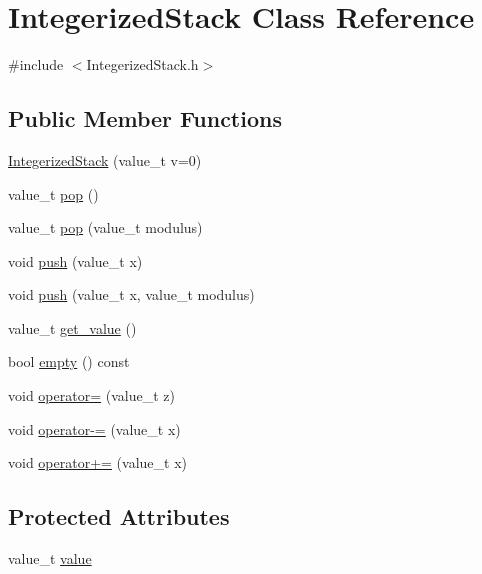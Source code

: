 \hypertarget{class_integerized_stack}{}\section{Integerized\+Stack Class Reference}
\label{class_integerized_stack}


{\ttfamily \#include $<$Integerized\+Stack.\+h$>$}

\subsection*{Public Member Functions}
\begin{DoxyCompactItemize}
\item 
\hyperlink{class_integerized_stack_a46b24ace7ea983bfabaa437932111440}{Integerized\+Stack} (value\+\_\+t v=0)
\item 
value\+\_\+t \hyperlink{class_integerized_stack_a5edd593c74341341cc6f8e41e0f14bdf}{pop} ()
\item 
value\+\_\+t \hyperlink{class_integerized_stack_a713da8c8102cb5a53ec3ad87fada36f5}{pop} (value\+\_\+t modulus)
\item 
void \hyperlink{class_integerized_stack_a721481e52e56398bee39edf6a3d2ff80}{push} (value\+\_\+t x)
\item 
void \hyperlink{class_integerized_stack_affd28eb928362de80e35cd4e1ecdf96b}{push} (value\+\_\+t x, value\+\_\+t modulus)
\item 
value\+\_\+t \hyperlink{class_integerized_stack_ac72013ff1034d8f05470e8314cf8525d}{get\+\_\+value} ()
\item 
bool \hyperlink{class_integerized_stack_a549d4ed66e89d2e3d7e726d5c8e28fa2}{empty} () const
\item 
void \hyperlink{class_integerized_stack_a829e18dc8bae3eb371e9822271102a2d}{operator=} (value\+\_\+t z)
\item 
void \hyperlink{class_integerized_stack_ac2ec311399b327573a2c0f19d2a902a4}{operator-\/=} (value\+\_\+t x)
\item 
void \hyperlink{class_integerized_stack_a70df05b936e94c717584290d0c457cca}{operator+=} (value\+\_\+t x)
\end{DoxyCompactItemize}
\subsection*{Protected Attributes}
\begin{DoxyCompactItemize}
\item 
value\+\_\+t \hyperlink{class_integerized_stack_afcfb2d32d51c88b556f3bb7ff2544be5}{value}
\end{DoxyCompactItemize}


